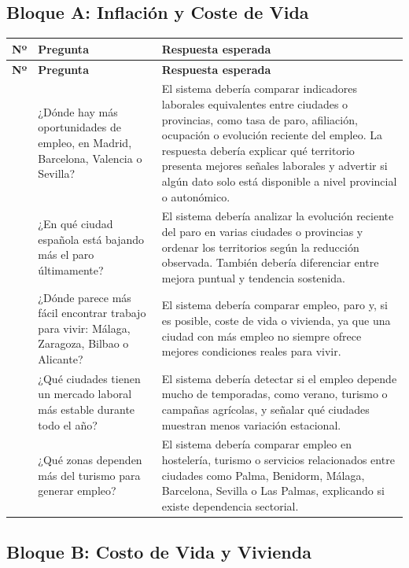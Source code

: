 \subsection{Bloque A: Inflación y Coste de Vida}

\begin{longtable}{>{\raggedright\arraybackslash}p{} >{\raggedright\arraybackslash}p{} >{\raggedright\arraybackslash}p{}}
\toprule
\textbf{Nº} & \textbf{Pregunta} & \textbf{Respuesta esperada} \\
\midrule
\endfirsthead
\toprule
\textbf{Nº} & \textbf{Pregunta} & \textbf{Respuesta esperada} \\
\midrule
\endhead
1 & ¿Dónde hay más oportunidades de empleo, en Madrid, Barcelona, Valencia o Sevilla? & El sistema debería comparar indicadores laborales equivalentes entre ciudades o provincias, como tasa de paro, afiliación, ocupación o evolución reciente del empleo. La respuesta debería explicar qué territorio presenta mejores señales laborales y advertir si algún dato solo está disponible a nivel provincial o autonómico. \\
2 & ¿En qué ciudad española está bajando más el paro últimamente? & El sistema debería analizar la evolución reciente del paro en varias ciudades o provincias y ordenar los territorios según la reducción observada. También debería diferenciar entre mejora puntual y tendencia sostenida. \\
3 & ¿Dónde parece más fácil encontrar trabajo para vivir: Málaga, Zaragoza, Bilbao o Alicante? & El sistema debería comparar empleo, paro y, si es posible, coste de vida o vivienda, ya que una ciudad con más empleo no siempre ofrece mejores condiciones reales para vivir. \\
4 & ¿Qué ciudades tienen un mercado laboral más estable durante todo el año? & El sistema debería detectar si el empleo depende mucho de temporadas, como verano, turismo o campañas agrícolas, y señalar qué ciudades muestran menos variación estacional. \\
5 & ¿Qué zonas dependen más del turismo para generar empleo? & El sistema debería comparar empleo en hostelería, turismo o servicios relacionados entre ciudades como Palma, Benidorm, Málaga, Barcelona, Sevilla o Las Palmas, explicando si existe dependencia sectorial. \\
\bottomrule
\end{longtable}

\subsection{Bloque B: Costo de Vida y Vivienda}

